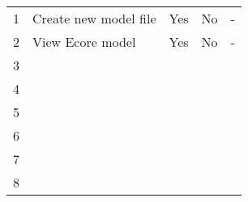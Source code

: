 \begin{longtable}{lllll}
\endhead
%
1 & Create new model file & Yes & No & - \\
2 & View Ecore model      & Yes & No & - \\
3 &                       &     &    &   \\
4 &                       &     &    &   \\
5 &                       &     &    &   \\
6 &                       &     &    &   \\
7 &                       &     &    &   \\
8 &                       &     &    &  
\end{longtable}